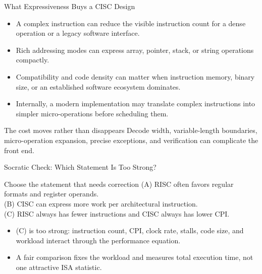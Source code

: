 \documentclass[aspectratio=169]{beamer}
\begin{document}
\begin{frame}{What Expressiveness Buys a CISC Design}
  \begin{itemize}
    \item A complex instruction can reduce the visible instruction count for
      a dense operation or a legacy software interface.
    \item Rich addressing modes can express array, pointer, stack, or string
      operations compactly.
    \item Compatibility and code density can matter when instruction memory,
      binary size, or an established software ecosystem dominates.
    \item Internally, a modern implementation may translate complex
      instructions into simpler micro-operations before scheduling them.
  \end{itemize}
  \begin{block}{The cost moves rather than disappears}
    Decode width, variable-length boundaries, micro-operation expansion,
    precise exceptions, and verification can complicate the front end.
  \end{block}
\end{frame}

\begin{frame}{Socratic Check: Which Statement Is Too Strong?}
  \begin{alertblock}{Choose the statement that needs correction}
    (A) RISC often favors regular formats and register operands.\\
    (B) CISC can express more work per architectural instruction.\\
    (C) RISC always has fewer instructions and CISC always has lower CPI.\\
  \end{alertblock}
  \begin{itemize}
    \item (C) is too strong: instruction count, CPI, clock rate, stalls, code
      size, and workload interact through the performance equation.
    \item A fair comparison fixes the workload and measures total execution
      time, not one attractive ISA statistic.
  \end{itemize}
\end{frame}
\end{document}
